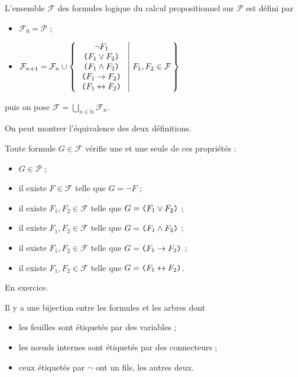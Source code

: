 \documentclass[./main]{subfiles}
\begin{document}
  \begin{defn}
    L'ensemble $\mathcal{F}$ des formules logique du calcul propositionnel sur $\mathcal{P}$ est défini par 
    \begin{itemize}
      \item $\mathcal{F}_0 = \mathcal{P}$ ;
      \item $\mathcal{F}_{n+1} = \mathcal{F}_n \cup \mleft\{\, 
          \begin{array}{c}
            \lnot F_1\\
            \verb|(| F_1 \lor F_2 \verb|)|\\
            \verb|(| F_1 \land F_2 \verb|)|\\
            \verb|(| F_1 \to F_2 \verb|)|\\
            \verb|(| F_1 \leftrightarrow F_2 \verb|)|
          \end{array}
        \;\middle|\; F_1, F_2 \in \mathcal{F} \,\mright\}  $
    \end{itemize}
    puis on pose $\mathcal{F} = \bigcup_{n \in \mathds{N}} \mathcal{F}_n$.
  \end{defn}

  On peut montrer l'équivalence des deux définitions.

  \begin{thm}
    Toute formule $G \in \mathcal{F}$ vérifie une et une seule de ces propriétés :
    \begin{itemize}
      \item $G \in \mathcal{P}$ ;
      \item il existe $F \in \mathcal{F}$ telle que $G = \lnot F$ ;
      \item il existe $F_1, F_2 \in \mathcal{F}$ telle que $G = \verb|(| F_1 \lor F_2 \verb|)|$ ;
      \item il existe $F_1, F_2 \in \mathcal{F}$ telle que $G = \verb|(| F_1 \land F_2 \verb|)|$ ;
      \item il existe $F_1, F_2 \in \mathcal{F}$ telle que $G = \verb|(| F_1 \to F_2 \verb|)|$ ;
      \item il existe $F_1, F_2 \in \mathcal{F}$ telle que $G = \verb|(| F_1 \leftrightarrow F_2 \verb|)|$.
    \end{itemize}
  \end{thm}
  \begin{prv}
    En exercice.
  \end{prv}

  \begin{crlr}
    Il y a une bijection entre les formules et les arbres dont
    \begin{itemize}
      \item les feuilles sont étiquetés par des variables ;
      \item les nœuds internes sont étiquetés par des connecteurs ;
      \item ceux étiquetés par $\lnot$ ont un fils, les autres deux.
    \end{itemize}
  \end{crlr}
\end{document}
